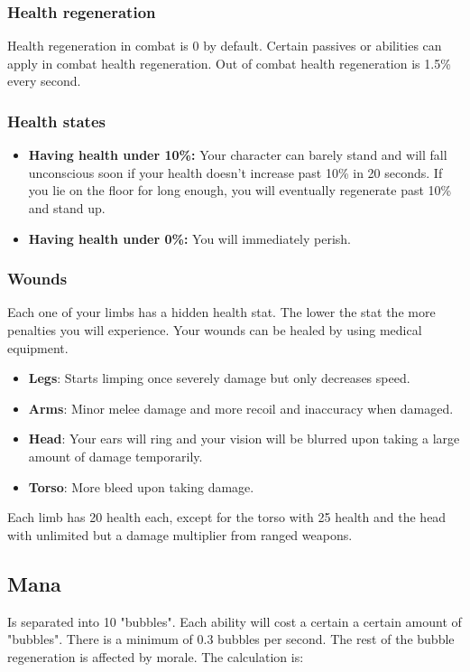 \documentclass{report}
\begin{document}
    \subsubsection{Health regeneration}
      Health regeneration in combat is 0 by default. Certain passives or abilities can apply in combat health regeneration. Out of combat health regeneration is 1.5\% every second.

    \subsubsection{Health states}
    \begin{itemize}
        \item \textbf{Having health under 10\%:} Your character can barely stand and will fall unconscious soon if your health doesn't increase past 10\% in 20 seconds. If you lie on the floor for long enough, you will eventually regenerate past 10\% and stand up.
        \item \textbf{Having health under 0\%:} You will immediately perish.
    \end{itemize}

    \subsubsection{Wounds} Each one of your limbs has a hidden health stat. The lower the stat the more penalties you will experience. Your wounds can be healed by using medical equipment.

    \begin{itemize}
        \item \textbf{Legs}: Starts limping once severely damage but only decreases speed.
        \item \textbf{Arms}: Minor melee damage and more recoil and inaccuracy when damaged.
        \item \textbf{Head}: Your ears will ring and your vision will be blurred upon taking a large amount of damage temporarily. 
        \item \textbf{Torso}: More bleed upon taking damage.
    \end{itemize}

        Each limb has 20 health each, except for the torso with 25 health and the head with unlimited but a damage multiplier from ranged weapons.


    
    \subsection{Mana} Is separated into 10 "bubbles". Each ability will cost a certain a certain amount of "bubbles". There is a minimum of 0.3 bubbles per second. The rest of the bubble regeneration is affected by morale. The calculation is:
    
\end{document}
